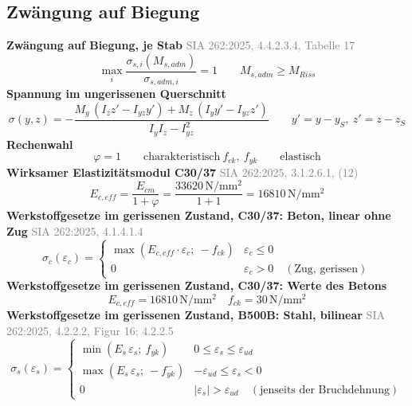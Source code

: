 \documentclass[11pt,a4paper]{article}
\newcommand{\normref}[1]{{\small\textcolor{gray}{#1}}}
\begin{document}
\subsection{Zwängung auf Biegung}
\noindent\textbf{Zwängung auf Biegung, je Stab} \hfill \normref{SIA 262:2025, 4.4.2.3.4, Tabelle 17}
\begin{equation*}
\max_i \frac{\sigma_{s,i}(M_{s,adm})}{\sigma_{s,adm,i}} = 1\qquad M_{s,adm} \ge M_{Riss}
\end{equation*}
\noindent\textbf{Spannung im ungerissenen Querschnitt}
\begin{equation*}
\sigma(y, z) = -\frac{M_y\,(I_z z' - I_{yz} y') + M_z\,(I_y y' - I_{yz} z')}{I_y I_z - I_{yz}^2}\qquad y' = y - y_S,\ z' = z - z_S
\end{equation*}
\noindent\textbf{Rechenwahl}
\begin{equation*}
\varphi = 1 \qquad \text{charakteristisch}\ f_{ck},\ f_{yk} \qquad \text{elastisch}
\end{equation*}
\noindent\textbf{Wirksamer Elastizitätsmodul C30/37} \hfill \normref{SIA 262:2025, 3.1.2.6.1, (12)}
\begin{equation*}
E_{c,eff} = \frac{E_{cm}}{1 + \varphi} = \frac{33620\,\mathrm{N}/\mathrm{mm}^{2}}{1 + 1} = 16810\,\mathrm{N}/\mathrm{mm}^{2}
\end{equation*}
\noindent\textbf{Werkstoffgesetze im gerissenen Zustand, C30/37: Beton, linear ohne Zug} \hfill \normref{SIA 262:2025, 4.1.4.1.4}
\begin{equation*}
\sigma_c(\varepsilon_c) = \begin{cases} \max\left(E_{c,eff} \cdot \varepsilon_c;\ -f_{ck}\right) & \varepsilon_c \le 0 \\[1ex] 0 & \varepsilon_c > 0 \quad (\text{Zug, gerissen}) \end{cases}
\end{equation*}
\noindent\textbf{Werkstoffgesetze im gerissenen Zustand, C30/37: Werte des Betons}
\begin{equation*}
E_{c,eff} = 16810\,\mathrm{N}/\mathrm{mm}^{2} \quad f_{ck} = 30\,\mathrm{N}/\mathrm{mm}^{2}
\end{equation*}
\noindent\textbf{Werkstoffgesetze im gerissenen Zustand, B500B: Stahl, bilinear} \hfill \normref{SIA 262:2025, 4.2.2.2, Figur 16; 4.2.2.5}
\begin{equation*}
\sigma_s(\varepsilon_s) = \begin{cases} \min(E_s\,\varepsilon_s;\ f_{yk}) & 0 \le \varepsilon_s \le \varepsilon_{ud} \\[1ex] \max(E_s\,\varepsilon_s;\ -f_{yk}^{-}) & -\varepsilon_{ud} \le \varepsilon_s < 0 \\[1ex] 0 & |\varepsilon_s| > \varepsilon_{ud} \quad (\text{jenseits der Bruchdehnung}) \end{cases}
\end{equation*}
\end{document}
